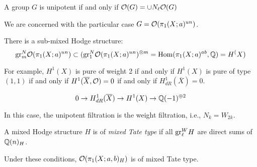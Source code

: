 \begin{defn}
A group $G$ is unipotent if and only if $\mathcal{O}(G) = \cup N_{\ell}\mathcal{O}(G)$
\end{defn}

We are concerned with the particular case $G = \mathcal{O}(\pi_1(X;a)^{un})$.

There is a sub-mixed Hodge structure:
\[
\mathrm{gr}^N_m \mathcal{O}(\pi_1(X;a)^{un}) \subset (\mathrm{gr}^N_1 \mathcal{O}(\pi_1(X;a)^{un})^{\otimes m} = \mathrm{Hom}(\pi_1(X;a)^{ab}, \mathbb{Q}) = H^(X)
\]

For example, $H^1(X)$ is pure of weight 2 if and only if $H^1(X)$ is pure of type $(1,1)$ if and only if $H^1(\overline{X}, \mathcal{O}) = 0$ if and only if $H^1_{dR}(\overline{X}) = 0$.

\[
0 \to H^1_{dR}(\overline{X}) \to H^1(X) \to \mathbb{Q}(-1)^{\oplus 2}
\]

\begin{rem}
In this case, the unipotent filtration is the weight filtration, i.e., $N_k = W_{2k}$.
\end{rem}

\begin{defn}
A mixed Hodge structure $H$ is of \emph{mixed Tate type} if all $\mathrm{gr}_{\ell}^W H$ are direct sums of $\mathbb{Q}(n)_H$.
\end{defn}

\begin{prop}
Under these conditions, $\mathcal{O}(\pi_1(X;a,b)_H)$ is of mixed Tate type.
\end{prop}

